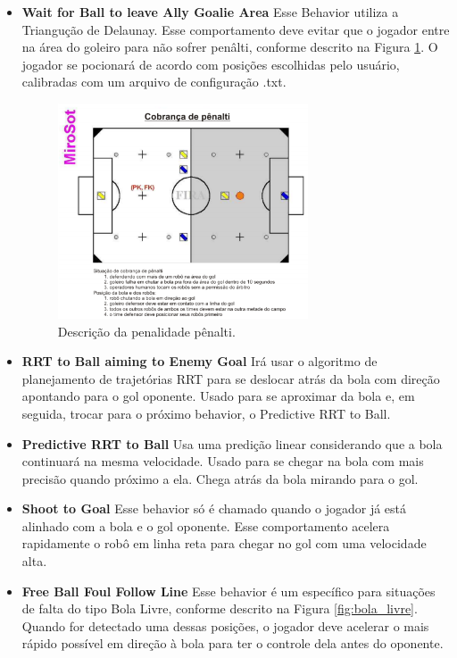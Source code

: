 \documentclass[conference]{IEEEtran}
\begin{document}
\begin{itemize}

\item \textbf{Wait for Ball to leave Ally Goalie Area} Esse Behavior utiliza a Triangução de Delaunay. Esse comportamento deve evitar que o jogador entre na área do goleiro para não sofrer penâlti, conforme descrito na Figura \ref{fig:penalty}. O jogador se pocionará de acordo com posições escolhidas pelo usuário, calibradas com um arquivo de configuração .txt.

\begin{figure}[H]
	\centering
	\includegraphics[width=0.7\textwidth]{figures/campo_penalty.png}
   \caption{Descrição da penalidade pênalti.} \label{fig:penalty}
\end{figure}

\item \textbf{RRT to Ball aiming to Enemy Goal} Irá usar o algoritmo de planejamento de trajetórias RRT para se deslocar atrás da bola com direção apontando para o gol oponente. Usado para se aproximar da bola e, em seguida, trocar para o próximo behavior, o Predictive RRT to Ball.

\item \textbf{Predictive RRT to Ball} Usa uma predição linear considerando que a bola continuará na mesma velocidade. Usado para se chegar na bola com mais precisão quando próximo a ela. Chega atrás da bola mirando para o gol.

\item \textbf{Shoot to Goal} Esse behavior só é chamado quando o jogador já está alinhado com a bola e o gol oponente. Esse comportamento acelera rapidamente o robô em linha reta para chegar no gol com uma velocidade alta.

\item \textbf{Free Ball Foul Follow Line} Esse behavior é um específico para situações de falta do tipo Bola Livre, conforme descrito na Figura \ref{fig:bola_livre}. Quando for detectado uma dessas posições, o jogador deve acelerar o mais rápido possível em direção à bola para ter o controle dela antes do oponente.


\end{itemize}
\end{document}
